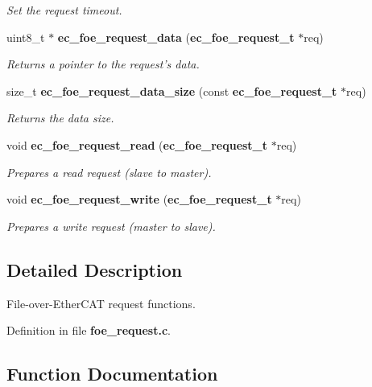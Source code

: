 \begin{DoxyCompactItemize}
\begin{DoxyCompactList}\small\item\em Set the request timeout. \end{DoxyCompactList}\item 
uint8\-\_\-t $\ast$ {\bf ec\-\_\-foe\-\_\-request\-\_\-data} ({\bf ec\-\_\-foe\-\_\-request\-\_\-t} $\ast$req)
\begin{DoxyCompactList}\small\item\em Returns a pointer to the request's data. \end{DoxyCompactList}\item 
size\-\_\-t {\bf ec\-\_\-foe\-\_\-request\-\_\-data\-\_\-size} (const {\bf ec\-\_\-foe\-\_\-request\-\_\-t} $\ast$req)
\begin{DoxyCompactList}\small\item\em Returns the data size. \end{DoxyCompactList}\item 
void {\bf ec\-\_\-foe\-\_\-request\-\_\-read} ({\bf ec\-\_\-foe\-\_\-request\-\_\-t} $\ast$req)
\begin{DoxyCompactList}\small\item\em Prepares a read request (slave to master). \end{DoxyCompactList}\item 
void {\bf ec\-\_\-foe\-\_\-request\-\_\-write} ({\bf ec\-\_\-foe\-\_\-request\-\_\-t} $\ast$req)
\begin{DoxyCompactList}\small\item\em Prepares a write request (master to slave). \end{DoxyCompactList}\end{DoxyCompactItemize}


\subsection{Detailed Description}
File-\/over-\/\-Ether\-C\-A\-T request functions. 

Definition in file {\bf foe\-\_\-request.\-c}.



\subsection{Function Documentation}
